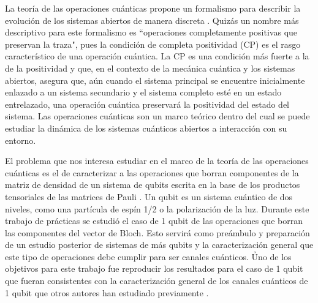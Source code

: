 La teoría de las operaciones cuánticas propone un formalismo para
describir la evolución de los sistemas abiertos de manera discreta
\cite{nielsen_chuang_2011}. 
Quizás un nombre más descriptivo para este formalismo es 
``operaciones completamente positivas que preservan la traza",
pues la condición de completa positividad (CP) es el rasgo característico 
de una operación cuántica. La CP es una condición más fuerte   
a la de la positividad y que, en el contexto de la
mecánica cuántica y los sistemas abiertos, asegura que, aún 
cuando el sistema principal se encuentre inicialmente enlazado 
a un sistema secundario y el sistema completo esté en 
un estado entrelazado, una operación cuántica preservará 
la positividad del estado del sistema. Las operaciones cuánticas son un
marco teórico dentro del cual se puede estudiar la dinámica de los 
sistemas cuánticos abiertos a interacción con su entorno.  

El problema que nos interesa estudiar en el marco de la teoría de 
las operaciones cuánticas es el de caracterizar a las
operaciones que borran componentes de la matriz de densidad
de un sistema de qubits escrita en la base de los productos 
tensoriales de las matrices de Pauli
. Un qubit es un sistema cuántico de dos niveles, 
como una partícula de espín 1/2 o la polarización de la luz. 
Durante este trabajo de prácticas se estudió el caso de 1 qubit de las 
operaciones que borran las componentes del vector de Bloch. Esto 
servirá como preámbulo y preparación de un estudio posterior 
de sistemas de más qubits y la caracterización general que este
tipo de operaciones debe cumplir para ser canales cuánticos.
\h{Uno de los objetivos para este trabajo fue reproducir los
resultados para el caso de 1 qubit que fueran 
consistentes con la caracterización general de 
los canales cuánticos de 1 qubit que otros autores han 
estudiado previamente 
\cite{bengtsson_zyczkowski_2017,nielsen_chuang_2011}.}


